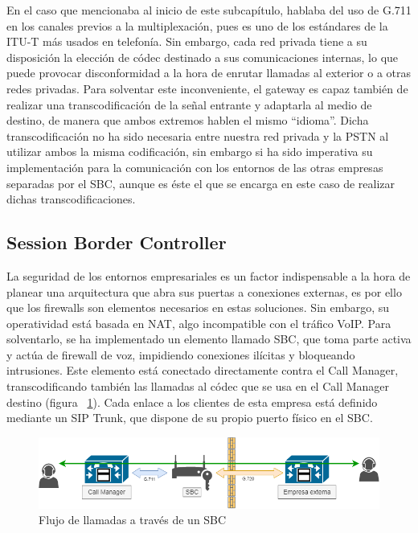 \documentclass[a4paper, 12pt]{book}
\begin{document}
En el caso que mencionaba al inicio de este subcapítulo, hablaba del uso de G.711 en los canales previos a la multiplexación, pues es uno de los estándares de la ITU-T más usados en telefonía. Sin embargo, cada red privada tiene a su disposición la elección de códec destinado a sus comunicaciones internas, lo que puede provocar disconformidad a la hora de enrutar llamadas al exterior o a otras redes privadas. 
Para solventar este inconveniente, el gateway es capaz también de realizar una transcodificación de la señal entrante y adaptarla al medio de destino, de manera que ambos extremos hablen el mismo ``idioma''. Dicha transcodificación no ha sido necesaria entre nuestra red privada y la PSTN al utilizar ambos la misma codificación, sin embargo si ha sido imperativa su implementación para la comunicación con los entornos de las otras empresas separadas por el SBC, aunque es éste el que se encarga en este caso de realizar dichas transcodificaciones.

\subsection{Session Border Controller}
\label{sec:sbc}

La seguridad de los entornos empresariales es un factor indispensable a la hora de planear una arquitectura que abra sus puertas a conexiones externas, es por ello que los firewalls son elementos necesarios en estas soluciones. Sin embargo, su operatividad está basada en NAT, algo incompatible con el tráfico VoIP.
Para solventarlo, se ha implementado un elemento llamado SBC, que toma parte activa y actúa de firewall de voz, impidiendo conexiones ilícitas y bloqueando intrusiones. Este elemento está conectado directamente contra el Call Manager, transcodificando también las llamadas al códec que se usa en el Call Manager destino (figura ~\ref{figura:fig_sbc}). Cada enlace a los clientes de esta empresa está definido mediante un SIP Trunk, que dispone de su propio puerto físico en el SBC.

\begin{figure}[h]
  \centering
  \includegraphics[scale=0.55]{img/fig_sbc}
  \caption{Flujo de llamadas a través de un SBC}
  \label{figura:fig_sbc}
\end{figure}
\end{document}
